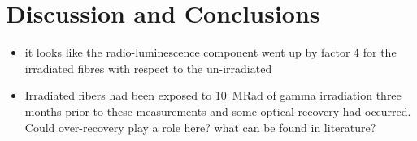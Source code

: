 \documentclass[a4paper,11pt]{article}
\begin{document}
\section{Discussion and Conclusions}
\label{sec:conclusions}

\begin{itemize}
    \item it looks like the radio-luminescence component went up by factor 4 for the irradiated fibres with respect to the un-irradiated
    \item Irradiated fibers had been exposed to 10~MRad of gamma irradiation three months prior to these measurements and some optical recovery had occurred. Could over-recovery play a role here? what can be found in literature?
\end{itemize}

%
%
\end{document}
